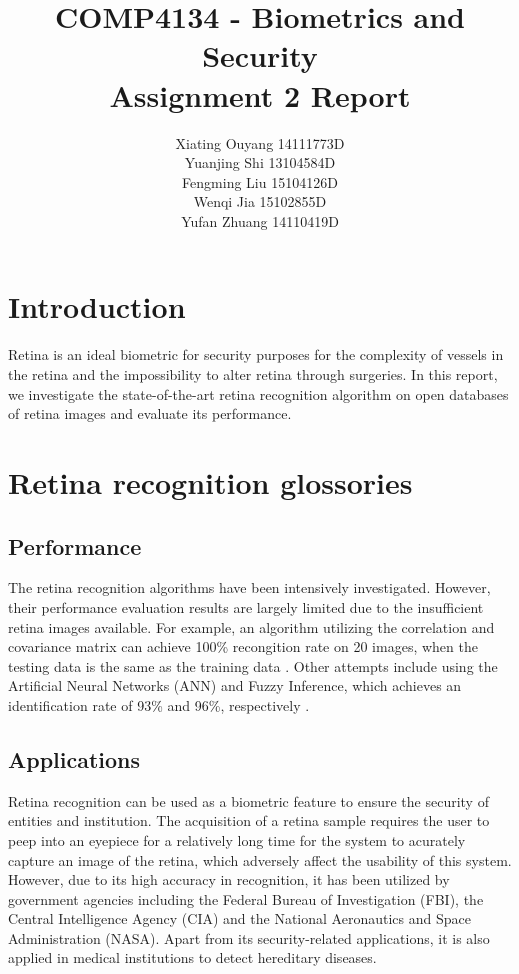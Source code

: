 \documentclass[a4paper,11pt]{article}
\title{\vspace{6cm}COMP4134 - Biometrics and Security \\ Assignment 2 Report}
\author{
	Xiating Ouyang 14111773D \\
	Yuanjing Shi 13104584D \\
	Fengming Liu 15104126D \\
	Wenqi Jia 15102855D \\
	Yufan Zhuang 14110419D \\
	}
\date{}
\theoremstyle{plain} %
\begin{document}
\maketitle	
\newpage
\section{Introduction}
Retina is an ideal biometric for security purposes for the complexity of vessels in the retina and the impossibility to alter retina through surgeries. In this report, we investigate the state-of-the-art retina recognition algorithm on open databases of retina images and evaluate its performance.

\section{Retina recognition glossories}

\subsection{Performance}
The retina recognition algorithms have been intensively investigated. However, their performance evaluation results are largely limited due to the insufficient retina images available. For example, an algorithm utilizing the correlation and covariance matrix can achieve 100\% recongition rate on 20 images, when the testing data is the same as the training data \cite{kakarwal2010analysis}. Other attempts include using the Artificial Neural Networks (ANN) and Fuzzy Inference, which achieves an identification rate of 93\% and 96\%, respectively \cite{borah2015retina}.


\subsection{Applications}
Retina recognition can be used as a biometric feature to ensure the security of entities and institution. The acquisition of a retina sample requires the user to peep into an eyepiece for a relatively long time for the system to acurately capture an image of the retina, which adversely affect the usability of this system. However, due to its high accuracy in recognition, it has been utilized by government agencies including the Federal Bureau of Investigation (FBI), the Central Intelligence Agency (CIA) and the National Aeronautics and Space Administration (NASA). Apart from its security-related applications, it is also applied in medical institutions to detect hereditary diseases.
\end{document}

